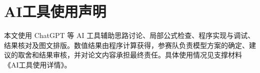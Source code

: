 \section*{AI工具使用声明}

本文使用 ChatGPT 等 AI 工具辅助思路讨论、局部公式检查、程序实现与调试、结果核对及图文排版。数值结果由程序计算获得，参赛队负责模型方案的确定、建议的取舍和结果审核，并对论文内容承担最终责任。具体使用情况见支撑材料《AI工具使用详情》。
